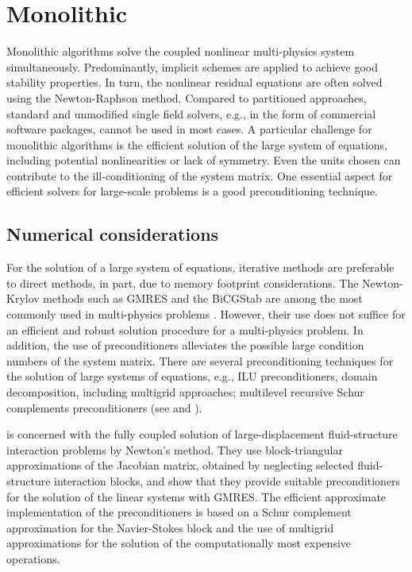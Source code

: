 \section{Monolithic}

Monolithic algorithms solve the coupled nonlinear multi-physics system simultaneously.
Predominantly, implicit schemes are applied to achieve good stability properties.
In turn, the nonlinear residual equations are often solved using the Newton-Raphson method.
Compared to partitioned approaches, standard and unmodified single field solvers, e.g., in the form of commercial software packages, cannot be used in most cases.
A particular challenge for monolithic algorithms is the efficient solution of the large system of equations, including potential nonlinearities or lack of symmetry.
Even the units chosen can contribute to the ill-conditioning of the system matrix.
One essential aspect for efficient solvers for large-scale problems is a good preconditioning technique. \citep{danowski_computational_2014}

\subsection{Numerical considerations}

For the solution of a large system of equations, iterative methods are preferable to direct methods, in part, due to memory footprint considerations.
The Newton-Krylov methods such as GMRES and the BiCGStab are among the most commonly used in multi-physics problems \citep{hron_monolithic_2006}.
However, their use does not suffice for an efficient and robust solution procedure for a multi-physics problem.
In addition, the use of preconditioners alleviates the possible large condition numbers of the system matrix.
There are several preconditioning techniques for the solution of large systems of equations, e.g., ILU preconditioners, domain decomposition, including multigrid approaches; multilevel recursive Schur complements preconditioners (see \cite{smith_domain_2004} and \cite{chen_matrix_2005}).

\cite{heil_efficient_2004} is concerned with the fully coupled solution of large-displacement fluid-structure interaction problems by Newton's method.
They use block-triangular approximations of the Jacobian matrix, obtained by neglecting selected fluid-structure interaction blocks, and show that they provide suitable preconditioners for the solution of the linear systems with GMRES.
The efficient approximate implementation of the preconditioners is based on a Schur complement approximation for the Navier-Stokes block and the use of multigrid approximations for the solution of the computationally most expensive operations.

